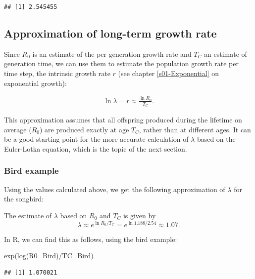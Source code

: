 \documentclass[
]{book}
\newenvironment{Shaded}{\begin{snugshade}}{\end{snugshade}}
\newcommand{\FunctionTok}[1]{\textcolor[rgb]{0.00,0.00,0.00}{#1}}
\newcommand{\NormalTok}[1]{#1}
\newcommand{\SpecialCharTok}[1]{\textcolor[rgb]{0.00,0.00,0.00}{#1}}
\begin{document}
\begin{verbatim}
## [1] 2.545455
\end{verbatim}

\hypertarget{approximation-of-long-term-growth-rate}{%
\subsection{Approximation of long-term growth rate}\label{approximation-of-long-term-growth-rate}}

Since \(R_0\) is an estimate of the per generation growth rate and \(T_C\) an estimate of generation time, we can use them to estimate the population growth rate per time step, the intrinsic growth rate \(r\) (see chapter \ref{s01-Exponential} on exponential growth):

\begin{align}
\ln\lambda = r \approx \frac{\ln R_0}{T_C}.
\label{eq:R0T}
\end{align}

This approximation assumes that all offspring produced during the lifetime on average (\(R_0\)) are produced exactly at age \(T_C\), rather than at different ages. It can be a good starting point for the more accurate calculation of \(\lambda\) based on the Euler-Lotka equation, which is the topic of the next section.

\hypertarget{bird-example-2}{%
\subsubsection*{Bird example}\label{bird-example-2}}

Using the values calculated above, we get the following approximation of \(\lambda\) for the songbird:

The estimate of \(\lambda\) based on \(R_0\) and \(T_C\) is given by
\[
\lambda\approx e^{\ln R_0/T_C}=e^{\ln 1.188/2.54}\approx 1.07.
\]

In R, we can find this as follows, using the bird example:

\begin{Shaded}
\begin{Highlighting}[]
\FunctionTok{exp}\NormalTok{(}\FunctionTok{log}\NormalTok{(R0\_Bird)}\SpecialCharTok{/}\NormalTok{TC\_Bird)}
\end{Highlighting}
\end{Shaded}

\begin{verbatim}
## [1] 1.070021
\end{verbatim}
\end{document}
